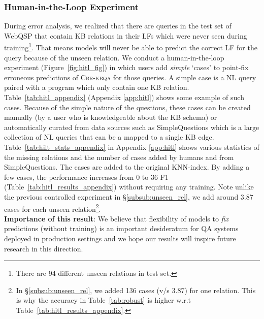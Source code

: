 \documentclass[11pt]{article}
\newcommand{\alg}{\textsc{Cbr-kbqa}\xspace}
\begin{document}
\subsubsection{Human-in-the-Loop Experiment}
\label{subsub:hitl}
During error analysis, we realized that there are queries in the test set of WebQSP that contain KB relations in their LFs which were never seen during training\footnote{There are 94 different unseen relations in test set.}. That means models will never be able to predict the correct LF for the query because of the unseen relation. We conduct a human-in-the-loop experiment (Figure~\ref{fig:hitl_fig}) in which users add \emph{simple} `cases' to point-fix erroneous predictions of \alg for those queries. A simple case is a NL query paired with a program which only contain one KB relation. Table~\ref{tab:hitl_appendix} (Appendix \ref{app:hitl}) shows some example of such cases. Because of the simple nature of the questions, these cases can be created manually (by a user who is knowledgeable about the KB schema) or automatically curated from data sources such as SimpleQuestions \cite{bordes2015large} which is a large collection of NL queries that can be a mapped to a single KB edge. Table~\ref{tab:hilt_stats_appendix} in Appendix \ref{app:hitl} shows various statistics of the missing relations and the number of cases added by humans and from SimpleQuestions. The cases are added to the original KNN-index. By adding a few cases, the performance increases from 0 to 36 F1 (Table~\ref{tab:hitl_results_appendix}) without requiring any training. Note unlike the previous controlled experiment in \S\ref{subsub:unseen_rel}, we add around 3.87 cases for each unseen relation\footnote{In \S\ref{subsub:unseen_rel}, we added 136 cases (v/s 3.87) for one relation. This is why the accuracy in Table~\ref{tab:robust} is higher w.r.t Table~\ref{tab:hitl_results_appendix}.}.\\
\noindent\textbf{Importance of this result}: We believe that flexibility of models to \emph{fix} predictions (without training) is an important desideratum for QA systems deployed in production settings and we hope our results will inspire future research in this direction.
\vspace{-1mm}
\end{document}
